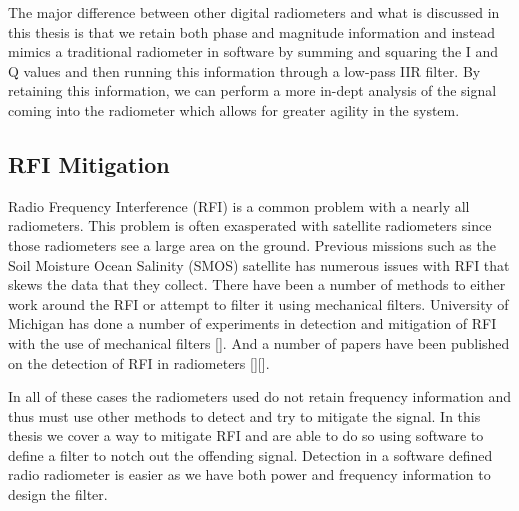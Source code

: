 The major difference between other digital radiometers and what is discussed in this thesis is that we retain both phase and magnitude information and instead mimics a traditional radiometer in software by summing and squaring the I and Q values and then running this information through a low-pass IIR filter.  By retaining this information, we can perform a more in-dept analysis of the signal coming into the radiometer which allows for greater agility in the system.

\subsection{RFI Mitigation}
Radio Frequency Interference (RFI) is a common problem with a nearly all radiometers.  This problem is often exasperated with satellite radiometers since those radiometers see a large area on the ground.  Previous missions such as the Soil Moisture Ocean Salinity (SMOS) satellite has numerous issues with RFI that skews the data that they collect.  There have been a number of methods to either work around the RFI or attempt to filter it using mechanical filters.  University of Michigan has done a number of experiments in detection and mitigation of RFI with the use of mechanical filters [\cite{DeRooRFI}].  And a number of papers have been published on the detection of RFI in radiometers [\citep{DeRoo}][\cite{Forte}].

In all of these cases the radiometers used do not retain frequency information and thus must use other methods to detect and try to mitigate the signal.  In this thesis we cover a way to mitigate RFI and are able to do so using software to define a filter to notch out the offending signal.  Detection in a software defined radio radiometer is easier as we have both power and frequency information to design the filter.